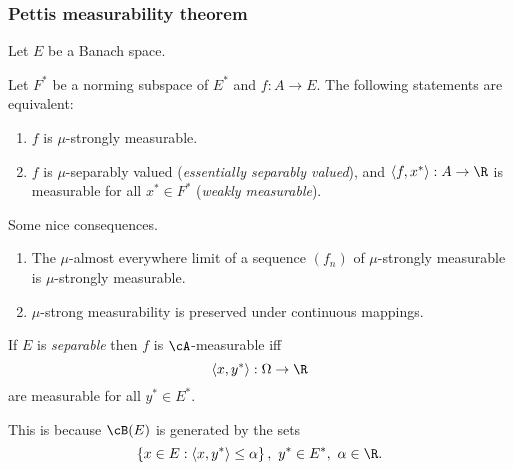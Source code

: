 \begin{frame}
    \frametitle{Pettis measurability theorem}
   
    Let $E$ be a Banach space.

    \begin{theorem}
        Let $F^*$ be a norming subspace of $E^*$ and $f:A \to E$. The following
        statements are equivalent:
        \begin{enumerate}
            \item $f$ is $\mu$-strongly measurable. 
            \item $f$ is $\mu$-separably valued (\emph{essentially separably valued}),
                and $\langle f,x^* \rangle: A\to \R$ is measurable for all $x^*
                \in F^*$ (\emph{weakly measurable}).
        \end{enumerate}
    \end{theorem}
\end{frame}

\begin{frame}
    
    Some nice consequences.
    
    \begin{enumerate}
        \item The $\mu$-almost everywhere limit of a sequence $(f_n)$ 
            of $\mu$-strongly measurable is $\mu$-strongly measurable. 
        \item $\mu$-strong measurability is preserved under continuous mappings.
    \end{enumerate}

    If $E$ is \emph{separable} then $f$ is $\cA$-measurable iff $$\langle x, y^*
    \rangle: \Omega \to \R$$ are measurable for all $y^* \in E^*$.

    This is because $\cB(E)$ is generated by the sets 
    \begin{equation*}
        \left\{ x \in E : \langle x,y^* \rangle \leq \alpha \right\}, 
        \ y^* \in E^*, \ \alpha\in\R.
    \end{equation*}
\end{frame}



